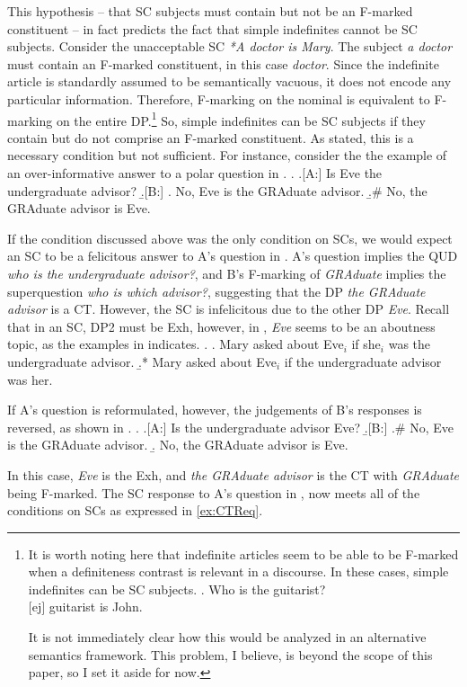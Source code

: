 \documentclass[letterpaper]{article}
\begin{document}
This hypothesis -- that SC subjects must contain but not be an F-marked constituent -- in fact predicts the fact that simple indefinites cannot be SC subjects.
Consider the unacceptable SC \textit{*A doctor is Mary}.
The subject \textit{a doctor} must contain an F-marked constituent, in this case \textit{doctor}.
Since the indefinite article is standardly assumed to be semantically vacuous, it does not encode any particular information.
Therefore, F-marking on the nominal is equivalent to F-marking on the entire DP.\footnote{
It is worth noting here that indefinite articles seem to be able to be F-marked when a definiteness contrast is relevant in a discourse.
In these cases, simple indefinites can be SC subjects.
\ex. Who is the guitarist?\\
$[$ej$]$ guitarist is John.

It is not immediately clear how this would be analyzed in an alternative semantics framework.
This problem, I believe, is beyond the scope of this paper, so I set it aside for now.
}
So, simple indefinites can be SC subjects if they contain but do not comprise an F-marked constituent.
As stated, this is a necessary condition but not sufficient.
For instance, consider the the example of an over-informative answer to a polar question in \Next \parencite[adapted from][]{mikkelsen2008specification}.
\ex.
\a.[A:] Is Eve the undergraduate advisor?
\b.[B:]
\a. No, Eve is the GRAduate advisor.
\b.\# No, the GRAduate advisor is Eve.

If the condition discussed above was the only condition on SCs, we would expect an SC to be a felicitous answer to A's question in \Last.
A's question implies the QUD \textit{who is the undergraduate advisor?}, and B's F-marking of \textit{GRAduate} implies the superquestion \textit{who is which advisor?}, suggesting that the DP \textit{the GRAduate advisor} is a CT.
However, the SC is infelicitous due to the other DP \textit{Eve}.
Recall that in an SC, DP2 must be Exh, however, in \Last, \textit{Eve} seems to be an aboutness topic, as the examples in \Next indicates.
\ex. 
\a. Mary asked about Eve$_i$ if she$_i$ was the undergraduate advisor.
\b.* Mary asked about Eve$_i$ if the undergraduate advisor was her.

If A's question is reformulated, however, the judgements of B's responses is reversed, as shown in \Next.
\ex.
\a.[A:] Is the undergraduate advisor Eve?
\b.[B:]
\a.\# No, Eve is the GRAduate advisor.
\b. No, the GRAduate advisor is Eve.

In this case, \textit{Eve} is the Exh, and \textit{the GRAduate advisor} is the CT with \textit{GRAduate} being F-marked.
The SC response to A's question in \Last, now meets all of the conditions on SCs as expressed in \ref{ex:CTReq}.
\end{document}
